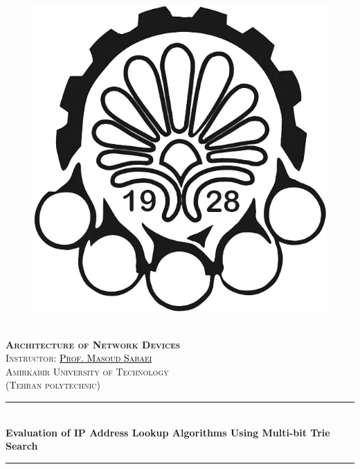 \documentclass[12pt	]{article}
\newcommand{\HRule}{\rule{\linewidth}{0.5mm}} %
\begin{document}
\begin{center}
    \begin{figure}
        \vspace{-1.0cm}
        \centering
        \includegraphics[scale = 0.35]{Images/AUT_logo.png} %
    \end{figure}
    \mbox{}\\[2.0cm]
    \textsc{\Huge \textbf{Architecture of Network Devices}}\\[1.0cm]
    \textsc{\LARGE Instructor: \href{https://scholar.google.com/citations?user=aIiC_6UAAAAJ&hl=en}{\textcolor{black}{Prof. Masoud Sabaei}}}\\[2.5cm]
    \textsc{\LARGE Amirkabir University of Technology} \\%
    \textsc{(Tehran polytechnic)}
    \HRule\\[0.4cm]
    {\large \bf {\selectfont Evaluation of IP Address Lookup Algorithms Using Multi-bit Trie Search} }\\[0.2cm]
    \HRule\\[1.5cm]
\end{center}
\end{document}
